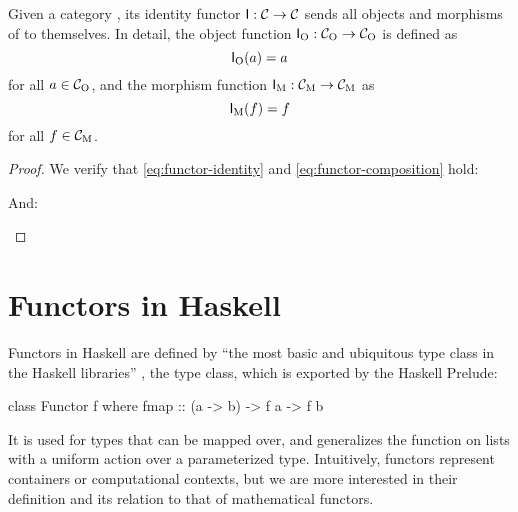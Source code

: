 \begin{example}
  \label{ex:functor-identity}


  Given a category , its identity functor $\mathsf{I}: \mathcal{C}
  \to \mathcal{C}$ sends all objects and morphisms of  to
  themselves. In detail, the object function $\mathsf{I}_{\operatorname{O}}: \mathcal{C}_{\operatorname{O}} \to
  \mathcal{C}_{\operatorname{O}}$ is defined as
  \begin{equation}
    \label{eq:functor-identity-object}
    \mathsf{I}_{\operatorname{O}}(a) = a
  \end{equation}
  for all $a \in \mathcal{C}_{\operatorname{O}}$, and the morphism function $\mathsf{I}_{\operatorname{M}}:
  \mathcal{C}_{\operatorname{M}} \to \mathcal{C}_{\operatorname{M}}$ as
  \begin{equation}
    \label{eq:functor-identity-morphism}
    \mathsf{I}_{\operatorname{M}}(f) = f
  \end{equation}
  for all $f \in \mathcal{C}_{\operatorname{M}}$.

  \begin{proof}

    We verify that \eqref{eq:functor-identity} and
    \eqref{eq:functor-composition} hold:
    \begin{steps}
        \eqby{\eqref{eq:functor-identity-object}}
    \end{steps}
    And:
    \begin{steps}
    \end{steps}

  \end{proof}

\end{example}

\section{Functors in Haskell}
\label{sec:functors-haskell}

Functors in Haskell are defined by ``the most basic and ubiquitous
type class in the Haskell libraries'' \parencite[18]{yorgey-2009}, the
 type class, which is exported by the Haskell
Prelude:
\begin{codehaskell}
class Functor f where
  fmap :: (a -> b) -> f a -> f b
\end{codehaskell}
It is used for types that can be mapped over, and generalizes the
 function on lists with a uniform action over a
parameterized type. Intuitively, functors represent containers or
computational contexts, but we are more interested in their definition
and its relation to that of mathematical functors.

